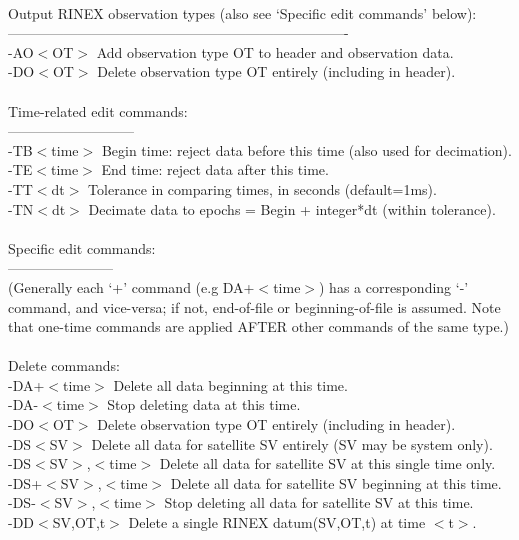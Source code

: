 \documentclass{article}
\begin{document}
\begin{\outputsize}
\\
 Output RINEX observation types (also see `Specific edit commands' below):\\
 -------------------------------------------------------------------------\\
 -AO$<$OT$>$         Add observation type OT to header and observation data.\\
 -DO$<$OT$>$         Delete observation type OT entirely (including in header).\\
\\
 Time-related edit commands:\\
 ---------------------------\\
 -TB$<$time$>$       Begin time: reject data before this time (also used for decimation).\\
 -TE$<$time$>$       End   time: reject data after this time.\\
 -TT$<$dt$>$         Tolerance in comparing times, in seconds (default=1ms).\\
 -TN$<$dt$>$         Decimate data to epochs = Begin + integer*dt (within tolerance).\\
\\
 Specific edit commands:\\
 -----------------------\\
 (Generally each `+' command (e.g DA+$<$time$>$) has a corresponding `-' command,
     and vice-versa; if not, end-of-file or beginning-of-file is assumed.
  Note that one-time commands are applied AFTER other commands of the same type.)\\
\\
 Delete commands:\\
 -DA+$<$time$>$      Delete all data beginning at this time.\\
 -DA-$<$time$>$      Stop deleting data at this time.\\
 -DO$<$OT$>$         Delete observation type OT entirely (including in header).\\
 -DS$<$SV$>$         Delete all data for satellite SV entirely (SV may be system only).\\
 -DS$<$SV$>$,$<$time$>$  Delete all data for satellite SV at this single time only.\\
 -DS+$<$SV$>$,$<$time$>$ Delete all data for satellite SV beginning at this time.\\
 -DS-$<$SV$>$,$<$time$>$ Stop deleting all data for satellite SV at this time.\\
 -DD$<$SV,OT,t$>$    Delete a single RINEX datum(SV,OT,t) at time $<$t$>$.\\

\end{\outputsize}
\end{document}
